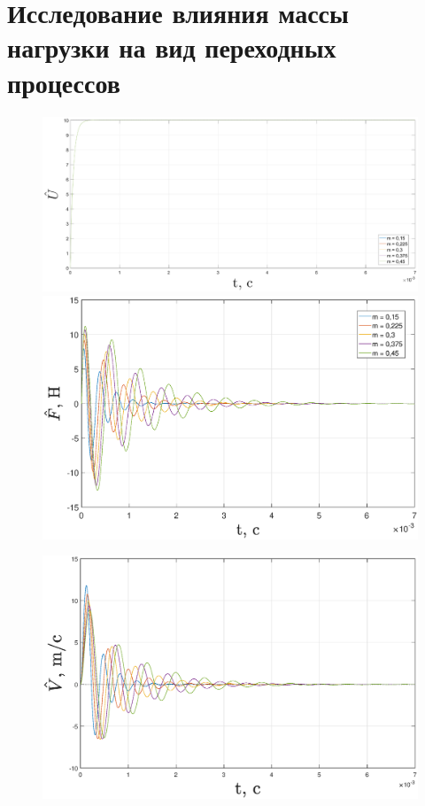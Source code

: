 \documentclass[fleqn, a4paper, 11pt, russian]{article}
\begin{document}
	\clearpage
	{\centering
		\section{Исследование влияния массы нагрузки на вид переходных процессов}
	}
	\begin{figure}[ht!]
		\centering
		\includegraphics[width = \textwidth]{mvar/mvarU}
		
		\includegraphics[width = \textwidth]{mvar/mvarF}
	\end{figure}
	\begin{figure}[ht!]
		\includegraphics[width = \textwidth]{mvar/mvarV}
	\end{figure}
\end{document}
